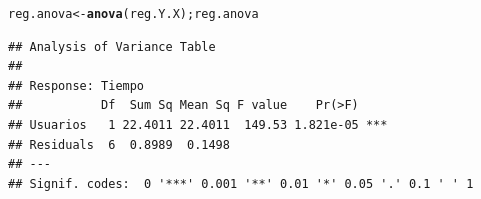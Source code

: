 \documentclass[12pt,letterpaper]{article}\usepackage[]{graphicx}\usepackage[]{color}
\makeatletter
\newcommand{\hlstd}[1]{\textcolor[rgb]{0.345,0.345,0.345}{#1}}%
\newcommand{\hlkwb}[1]{\textcolor[rgb]{0.69,0.353,0.396}{#1}}%
\newcommand{\hlkwd}[1]{\textcolor[rgb]{0.737,0.353,0.396}{\textbf{#1}}}%
\newenvironment{kframe}{%
 \def\at@end@of@kframe{}%
 \ifinner\ifhmode%
  \def\at@end@of@kframe{\end{minipage}}%
  \begin{minipage}{\columnwidth}%
 \fi\fi%
 \def\FrameCommand##1{\hskip\@totalleftmargin \hskip-\fboxsep
 \colorbox{shadecolor}{##1}\hskip-\fboxsep
     \hskip-\linewidth \hskip-\@totalleftmargin \hskip\columnwidth}%
 \MakeFramed {\advance\hsize-\width
   \@totalleftmargin\z@ \linewidth\hsize
   \@setminipage}}%
 {\par\unskip\endMakeFramed%
 \at@end@of@kframe}
\newenvironment{knitrout}{}{} %
\makeatother
\begin{document}
\begin{enumerate}
\begin{knitrout}
\color{fgcolor}\begin{kframe}
\begin{alltt}
\hlstd{reg.anova} \hlkwb{<-} \hlkwd{anova}\hlstd{(reg.Y.X); reg.anova}
\end{alltt}
\begin{verbatim}
## Analysis of Variance Table
## 
## Response: Tiempo
##           Df  Sum Sq Mean Sq F value    Pr(>F)    
## Usuarios   1 22.4011 22.4011  149.53 1.821e-05 ***
## Residuals  6  0.8989  0.1498                      
## ---
## Signif. codes:  0 '***' 0.001 '**' 0.01 '*' 0.05 '.' 0.1 ' ' 1
\end{verbatim}
\end{kframe}
\end{knitrout}


  
  
  
  
  
  
  
  
  
  
  
  
  
\end{enumerate}
\end{document}
